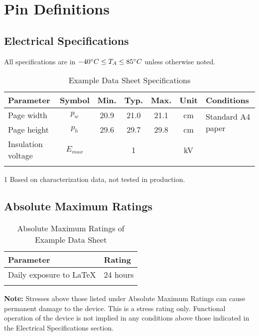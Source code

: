 \documentclass[10pt]{datasheet}
\begin{document}
\section{Pin Definitions}

\subsection{Electrical Specifications}
	All specifications are in $-40\degree C \leq T_A \leq 85\degree C$ unless otherwise noted.
	
	\begin{table}[h]
		\begin{threeparttable}
			\caption{Example Data Sheet Specifications}
			\begin{tabularx}{\textwidth}{l | c | c c c | c | X}
				\thickhline
				\textbf{Parameter} & \textbf{Symbol} & \textbf{Min.} & \textbf{Typ.} & \textbf{Max.} &
				\textbf{Unit} & \textbf{Conditions} \\
				\hline
				Page width  & $p_w$ & 20.9 & 21.0 & 21.1 & cm & \multirow{2}{*}{Standard A4 paper} \\
				Page height & $p_h$ & 29.6 & 29.7 & 29.8 & cm &  \\
				\hline
				Insulation voltage & $E_{max}$\tnote{1} & & 1 & & kV & \\
				\thickhline
			\end{tabularx}
			
			\begin{tablenotes}
				\item[1]{Based on characterization data, not tested in production.}
			\end{tablenotes}
		\end{threeparttable}
	\end{table}

\subsection{Absolute Maximum Ratings}

	\begin{table}[h]
		\caption{Absolute Maximum Ratings of Example Data Sheet}
		\begin{tabularx}{\textwidth}{l | X}
			\thickhline
			\textbf{Parameter} & \textbf{Rating} \hspace{5cm} \\
			\hline
			Daily exposure to LaTeX & 24 hours \\
			\thickhline
		\end{tabularx}
	\end{table}
	
	\textbf{Note:} Stresses above those listed under Absolute Maximum Ratings can
	cause permanent damage to the device. This is a stress rating only. Functional
	operation of the device is not implied in any conditions above those indicated
	in the Electrical Specifications section.

\clearpage

\begin{versionhistory}
\end{versionhistory}
\end{document}

